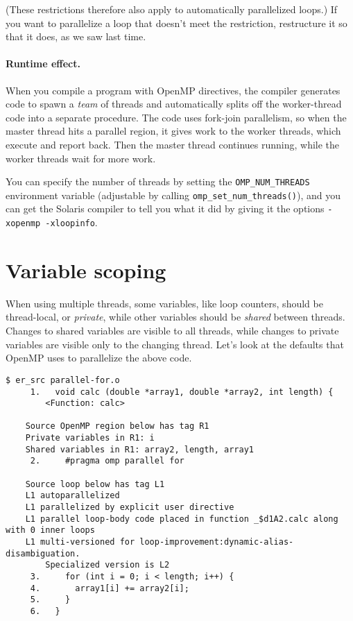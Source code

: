 (These restrictions therefore also apply to automatically parallelized
loops.) If you want to parallelize a loop that doesn't meet the 
restriction, restructure it so that it does, as we saw last time.

\paragraph{Runtime effect.} When you compile a program with 
OpenMP directives, the compiler generates code to spawn a \emph{team}
of threads and automatically splits off the worker-thread code into a
separate procedure. The code uses fork-join parallelism, so when the
master thread hits a parallel region, it gives work to the worker
threads, which execute and report back. Then the master thread
continues running, while the worker threads wait for more work.

You can specify the number of threads by setting the
\verb+OMP_NUM_THREADS+ environment variable (adjustable by calling 
\verb+omp_set_num_threads()+), and you can get the
Solaris compiler to tell you what it did by giving it the
options \verb+-xopenmp -xloopinfo+.

\section*{Variable scoping}
When using multiple threads, some variables, like loop counters,
should be thread-local, or \emph{private}, while other variables
should be \emph{shared} between threads. Changes to shared variables
are visible to all threads, while changes to private variables are
visible only to the changing thread. Let's look at the defaults that
OpenMP uses to parallelize the above code.

{ 
\begin{verbatim}
$ er_src parallel-for.o
     1.   void calc (double *array1, double *array2, int length) {
        <Function: calc>
    
    Source OpenMP region below has tag R1
    Private variables in R1: i
    Shared variables in R1: array2, length, array1
     2.     #pragma omp parallel for
    
    Source loop below has tag L1
    L1 autoparallelized
    L1 parallelized by explicit user directive
    L1 parallel loop-body code placed in function _$d1A2.calc along with 0 inner loops
    L1 multi-versioned for loop-improvement:dynamic-alias-disambiguation. 
        Specialized version is L2
     3.     for (int i = 0; i < length; i++) {
     4.       array1[i] += array2[i];
     5.     }
     6.   }
\end{verbatim}
}

